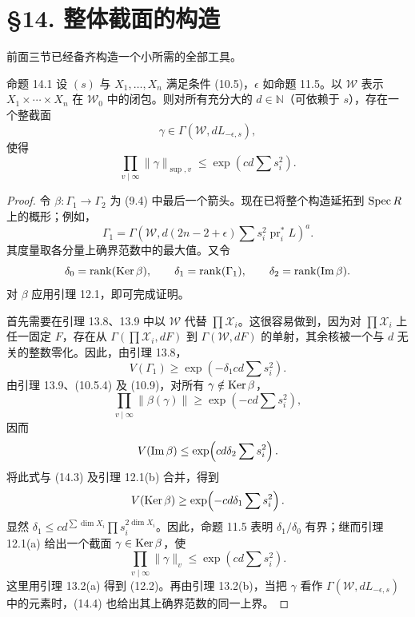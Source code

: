 \section*{§14. 整体截面的构造}
前面三节已经备齐构造一个小所需的全部工具。
\begin{statement}{命题 14.1}
设 $(s)$ 与 $X_1,\ldots,X_n$ 满足条件 (10.5)，$\epsilon$ 如命题 11.5。以 $\mathscr W$ 表示 $X_1\times\cdots\times X_n$ 在 $\mathscr W_0$ 中的闭包。则对所有充分大的 $d\in\mathbb N$（可依赖于 $s$），存在一个整截面
\[
\gamma\in\Gamma(\mathscr W,dL_{-\epsilon,s}),
\]
使得
\begin{equation*}\tag{14.2}
\prod_{v\mid\infty}\|\gamma\|_{\sup,v}\le\exp\!\left(cd\sum s_i^2\right).
\end{equation*}
\end{statement}
\begin{proof}
令 $\beta:\Gamma_1\to\Gamma_2$ 为  (9.4) 中最后一个箭头。现在已将整个构造延拓到 $\operatorname{Spec} R$ 上的概形；例如，
\[
\Gamma_1=\Gamma\!\left(\mathscr W,d(2n-2+\epsilon)\sum s_i^2\operatorname{pr}_i^*L\right)^a.
\]
其度量取各分量上确界范数中的最大值。又令
\[
\delta_0=\operatorname{rank}(\operatorname{Ker}\beta),\qquad
\delta_1=\operatorname{rank}(\Gamma_1),\qquad
\delta_2=\operatorname{rank}(\operatorname{Im}\beta).
\]
对 $\beta$ 应用引理 12.1，即可完成证明。

首先需要在引理 13.8、13.9 中以 $\mathscr W$ 代替 $\prod\mathscr X_i$。这很容易做到，因为对 $\prod\mathscr X_i$ 上任一固定 $F$，存在从 $\Gamma(\prod\mathscr X_i,dF)$ 到 $\Gamma(\mathscr W,dF)$ 的单射，其余核被一个与 $d$ 无关的整数零化。因此，由引理 13.8，
\begin{equation*}\tag{14.3}
V(\Gamma_1)\ge\exp\!\left(-\delta_1cd\sum s_i^2\right).
\end{equation*}
由引理 13.9、(10.5.4) 及 (10.9)，对所有 $\gamma\notin\operatorname{Ker}\beta$，
\[
\prod_{v\mid\infty}\|\beta(\gamma)\|\ge\exp\!\left(-cd\sum s_i^2\right),
\]
因而
\[
V(\operatorname{Im}\beta)\le\exp\!\left(cd\delta_2\sum s_i^2\right).
\]
将此式与 (14.3) 及引理 12.1(b) 合并，得到
\[
V(\operatorname{Ker}\beta)\ge\exp\!\left(-cd\delta_1\sum s_i^2\right).
\]
显然 $\delta_1\le cd^{\sum\dim X_i}\prod s_i^{2\dim X_i}$。因此，命题 11.5 表明 $\delta_1/\delta_0$ 有界；继而引理 12.1(a) 给出一个截面 $\gamma\in\operatorname{Ker}\beta$，使
\begin{equation*}\tag{14.4}
\prod_{v\mid\infty}\|\gamma\|_v\le\exp\!\left(cd\sum s_i^2\right).
\end{equation*}
这里用引理 13.2(a) 得到 (12.2)。再由引理 13.2(b)，当把 $\gamma$ 看作 $\Gamma(\mathscr W,dL_{-\epsilon,s})$ 中的元素时，(14.4) 也给出其上确界范数的同一上界。
\end{proof}

